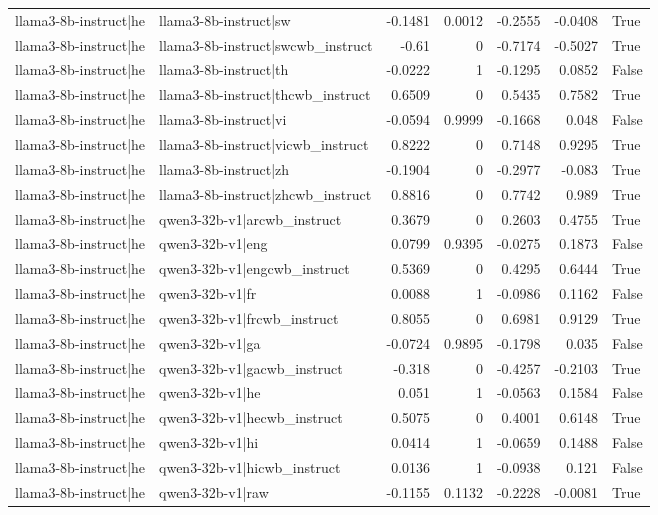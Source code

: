 \begin{table}
\begin{tabular}{l l r r r r l}
llama3-8b-instruct|he & llama3-8b-instruct|sw & -0.1481 & 0.0012 & -0.2555 & -0.0408 & True \\
llama3-8b-instruct|he & llama3-8b-instruct|swcwb_instruct & -0.61 & 0 & -0.7174 & -0.5027 & True \\
llama3-8b-instruct|he & llama3-8b-instruct|th & -0.0222 & 1 & -0.1295 & 0.0852 & False \\
llama3-8b-instruct|he & llama3-8b-instruct|thcwb_instruct & 0.6509 & 0 & 0.5435 & 0.7582 & True \\
llama3-8b-instruct|he & llama3-8b-instruct|vi & -0.0594 & 0.9999 & -0.1668 & 0.048 & False \\
llama3-8b-instruct|he & llama3-8b-instruct|vicwb_instruct & 0.8222 & 0 & 0.7148 & 0.9295 & True \\
llama3-8b-instruct|he & llama3-8b-instruct|zh & -0.1904 & 0 & -0.2977 & -0.083 & True \\
llama3-8b-instruct|he & llama3-8b-instruct|zhcwb_instruct & 0.8816 & 0 & 0.7742 & 0.989 & True \\
llama3-8b-instruct|he & qwen3-32b-v1|arcwb_instruct & 0.3679 & 0 & 0.2603 & 0.4755 & True \\
llama3-8b-instruct|he & qwen3-32b-v1|eng & 0.0799 & 0.9395 & -0.0275 & 0.1873 & False \\
llama3-8b-instruct|he & qwen3-32b-v1|engcwb_instruct & 0.5369 & 0 & 0.4295 & 0.6444 & True \\
llama3-8b-instruct|he & qwen3-32b-v1|fr & 0.0088 & 1 & -0.0986 & 0.1162 & False \\
llama3-8b-instruct|he & qwen3-32b-v1|frcwb_instruct & 0.8055 & 0 & 0.6981 & 0.9129 & True \\
llama3-8b-instruct|he & qwen3-32b-v1|ga & -0.0724 & 0.9895 & -0.1798 & 0.035 & False \\
llama3-8b-instruct|he & qwen3-32b-v1|gacwb_instruct & -0.318 & 0 & -0.4257 & -0.2103 & True \\
llama3-8b-instruct|he & qwen3-32b-v1|he & 0.051 & 1 & -0.0563 & 0.1584 & False \\
llama3-8b-instruct|he & qwen3-32b-v1|hecwb_instruct & 0.5075 & 0 & 0.4001 & 0.6148 & True \\
llama3-8b-instruct|he & qwen3-32b-v1|hi & 0.0414 & 1 & -0.0659 & 0.1488 & False \\
llama3-8b-instruct|he & qwen3-32b-v1|hicwb_instruct & 0.0136 & 1 & -0.0938 & 0.121 & False \\
llama3-8b-instruct|he & qwen3-32b-v1|raw & -0.1155 & 0.1132 & -0.2228 & -0.0081 & True \\

\end{tabular}
\end{table}
